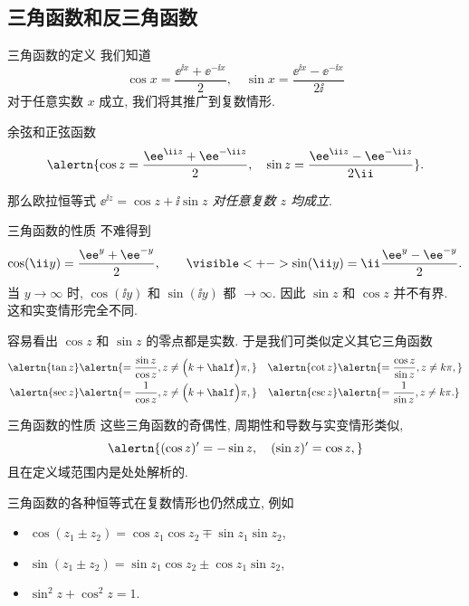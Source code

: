 \subsection{三角函数和反三角函数}

\begin{frame}{三角函数的定义}
	\onslide<+->
	我们知道
	\[
		\cos x=\frac{\ee^{\ii x}+\ee^{-\ii x}}2,\quad
		\sin x=\frac{\ee^{\ii x}-\ee^{-\ii x}}{2\ii}
	\]
	对于任意实数 $x$ 成立,
	\onslide<+->
	我们将其推广到复数情形.
	\onslide<+->
	\begin{definition}
		余弦和正弦函数
		\[
			\alertn{\cos z=\frac{\ee^{\ii z}+\ee^{-\ii z}}2,\quad
			\sin z=\frac{\ee^{\ii z}-\ee^{-\ii z}}{2\ii}}.
		\]
	\end{definition}
	\onslide<+->
	那么欧拉恒等式 \emph{$\ee^{\ii z}=\cos z+\ii\sin z$ 对任意复数 $z$ 均成立}.
\end{frame}


\begin{frame}{三角函数的性质}
	\onslide<+->
	不难得到
	\[
		\cos(\ii y)=\dfrac{\ee^y+\ee^{-y}}2,\qquad
		\visible<+->{\sin(\ii y)=\ii\dfrac{\ee^y-\ee^{-y}}2.}
	\]
	\onslide<+->
	当 $y\to\infty$ 时, $\cos(\ii y)$ 和 $\sin(\ii y)$ 都 $\to\infty$.
	\onslide<+->
	因此 \alert{$\sin z$ 和 $\cos z$ 并不有界}. 
	\onslide<+->
	这和实变情形完全不同.

	\onslide<+->
	容易看出 $\cos z$ 和 $\sin z$ 的零点都是实数.
	\onslide<+->
	于是我们可类似定义其它三角函数
	\begin{align*}
		\alertn{\tan z}&
		\alertn{=\frac{\sin z}{\cos z},z\neq\Bigl(k+\half\Bigr)\pi,}&
		\alertn{\cot z}&
		\alertn{=\frac{\cos z}{\sin z},z\neq k\pi,}\\
		\alertn{\sec z}&
		\alertn{=\frac{1}{\cos z},z\neq\Bigl(k+\half\Bigr)\pi,}&
		\alertn{\csc z}&
		\alertn{=\frac{1}{\sin z},z\neq k\pi.}
	\end{align*}
\end{frame}


\begin{frame}{三角函数的性质}
	\onslide<+->
	这些三角函数的奇偶性, 周期性和导数与实变情形类似,
	\[
		\alertn{(\cos z)'=-\sin z,\quad
		(\sin z)'=\cos z,}
	\]
	\onslide<+->
	且在定义域范围内是处处解析的.

	\onslide<+->
	三角函数的各种恒等式在复数情形也仍然成立,
	\onslide<+->
	例如
	\begin{itemize}
		\item $\cos(z_1\pm z_2)=\cos z_1 \cos z_2\mp \sin z_1 \sin z_2$,
		\item $\sin(z_1\pm z_2)=\sin z_1 \cos z_2\pm\cos z_1 \sin z_2$,
		\item $\sin^2z+\cos^2z=1$.
	\end{itemize}
\end{frame}


